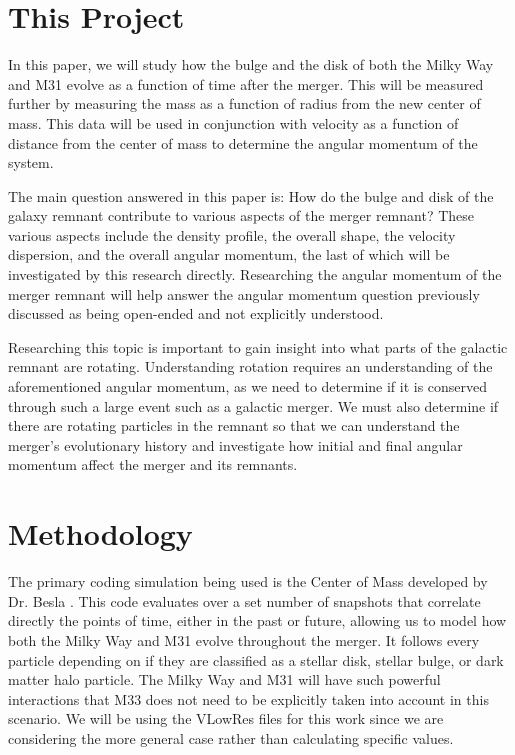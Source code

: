 \documentclass[twocolumn]{aastex631}
\begin{document}

\section{This Project} \label{sec:style}

In this paper, we will study how the bulge and the disk of both the Milky Way and M31 evolve as a function of time after the merger. This will be measured further by measuring the mass as a function of radius from the new center of mass. This data will be used in conjunction with velocity as a function of distance from the center of mass to determine the angular momentum of the system. 

The main question answered in this paper is: How do the bulge and disk of the galaxy remnant contribute to various aspects of the merger remnant? These various aspects include the density profile, the overall shape, the velocity dispersion, and the overall angular momentum, the last of which will be investigated by this research directly. Researching the angular momentum of the merger remnant will help answer the angular momentum question previously discussed as being open-ended and not explicitly understood. 

Researching this topic is important to gain insight into what parts of the galactic remnant are rotating. Understanding rotation requires an understanding of the aforementioned angular momentum, as we need to determine if it is conserved through such a large event such as a galactic merger. We must also determine if there are rotating particles in the remnant so that we can understand the merger's evolutionary history and investigate how initial and final angular momentum affect the merger and its remnants. 



\section{Methodology}
The primary coding simulation being used is the Center of Mass developed by Dr. Besla \cite{}. This code evaluates over a set number of snapshots that correlate directly the points of time, either in the past or future, allowing us to model how both the Milky Way and M31 evolve throughout the merger. It follows every particle depending on if they are classified as a stellar disk, stellar bulge, or dark matter halo particle. The Milky Way and M31 will have such powerful interactions that M33 does not need to be explicitly taken into account in this scenario. We will be using the VLowRes files for this work since we are considering the more general case rather than calculating specific values. 
\end{document}
